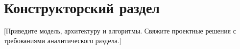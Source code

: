 \section{Конструкторский раздел}

[Приведите модель, архитектуру и алгоритмы. Свяжите проектные решения
с требованиями аналитического раздела.]
